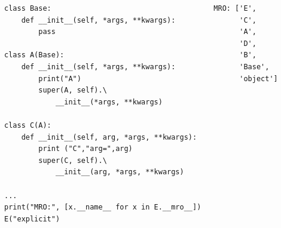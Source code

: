 \begin{frame}[fragile]
%
\begin{columns}[T]
\begin{codebox}
\begin{verbatim}
class Base:
    def __init__(self, *args, **kwargs):
        pass

class A(Base):
    def __init__(self, *args, **kwargs):
        print("A")
        super(A, self).\
            __init__(*args, **kwargs)

class C(A):
    def __init__(self, arg, *args, **kwargs):
        print ("C","arg=",arg)
        super(C, self).\
            __init__(arg, *args, **kwargs)

...
print("MRO:", [x.__name__ for x in E.__mro__])
E("explicit")
\end{verbatim}
\end{codebox}
%
\begin{cmdbox}[Output]
\begin{verbatim}
MRO: ['E',
      'C',
      'A',
      'D',
      'B',
      'Base',
      'object']


\end{verbatim}
\end{cmdbox}
\end{columns}
\end{frame}
